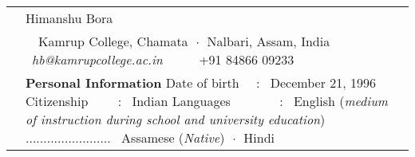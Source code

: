 \documentclass[a4paper, 11pt]{article}
\newenvironment{SectionTable}[1]{
	\renewcommand*{\arraystretch}{1.7}
	\setlength{\tabcolsep}{10pt}
	\begin{longtable}{Rp{5.2in}} & #1 \\}
{\end{longtable}\vspace{-.3cm}}
\begin{document}

\begin{SectionTable}{\Huge \color{Bittersweet} Himanshu Bora}
& 
\faMapMarker \ \ Kamrup College, Chamata $\;\boldsymbol{\cdot}\;$ Nalbari, Assam, India \newline
\faEnvelope \  \textit{hb@kamrupcollege.ac.in} \ \ \ \  \faPhone \ +91 84866 09233 \ \ \ \ \\
		
&
{\textbf {Personal Information}} \newline
Date of birth \ \ : \ December 21, 1996 \newline
Citizenship \ \ \ \ : \ Indian \newline
Languages \ \ \ \ \ \ \ : \ English (\textit{medium of instruction during school and university education}) \newline 
{\color{white} ........................} \ Assamese (\textit{Native}) $\;\boldsymbol{\cdot}\;$  Hindi 
\end{SectionTable}
\end{document}
